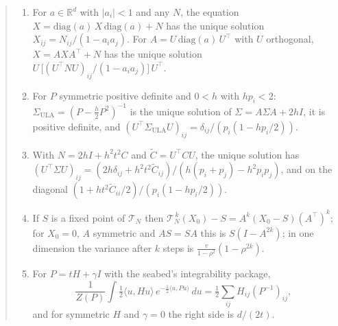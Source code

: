 \documentclass[11pt]{article}
\newcommand{\R}{\mathbb{R}}
\begin{document}
\begin{quote}\itshape
\begin{enumerate}
\item[(L)] For $a \in \R^d$ with $|a_i| < 1$ and any $N$, the equation
$X = \mathrm{diag}(a)\,X\,\mathrm{diag}(a) + N$ has the unique solution
$X_{ij} = N_{ij}/(1 - a_ia_j)$. For $A = U\,\mathrm{diag}(a)\,U^\top$ with
$U$ orthogonal, $X = AXA^\top + N$ has the unique solution
$U\,\big[(U^\top NU)_{ij}/(1 - a_ia_j)\big]\,U^\top$.
\item[(U)] For $P$ symmetric positive definite and $0 < h$ with
$hp_i < 2$: $\Sigma_{\mathrm{ULA}} = (P - \tfrac h2 P^2)^{-1}$ is the
unique solution of $\Sigma = A\Sigma A + 2hI$, it is positive definite,
and $(U^\top\Sigma_{\mathrm{ULA}}U)_{ij} = \delta_{ij}/(p_i(1 - hp_i/2))$.
\item[(M)] With $N = 2hI + h^2t^2C$ and $\tilde C = U^\top CU$, the
unique solution has $(U^\top\Sigma U)_{ij} = (2h\delta_{ij} +
h^2t^2\tilde C_{ij})/(h(p_i + p_j) - h^2p_ip_j)$, and on the diagonal
$(1 + ht^2\tilde C_{ii}/2)/(p_i(1 - hp_i/2))$.
\item[(F)] If $S$ is a fixed point of $\mathcal T_N$ then
$\mathcal T_N^{\,k}(X_0) - S = A^k(X_0 - S)(A^\top)^k$; for $X_0 = 0$,
$A$ symmetric and $AS = SA$ this is $S(I - A^{2k})$; in one dimension the
variance after $k$ steps is $\frac{v}{1 - \rho^2}(1 - \rho^{2k})$.
\item[(G)] For $P = tH + \gamma I$ with the seabed's integrability
package,
\[
\frac{1}{Z(P)}\int \tfrac12\langle u, Hu\rangle\,
e^{-\frac12\langle u, Pu\rangle}\,du = \tfrac12\sum_{ij}H_{ij}(P^{-1})_{ij},
\]
and for symmetric $H$ and $\gamma = 0$ the right side is $d/(2t)$.
\end{enumerate}
\end{quote}
\end{document}
